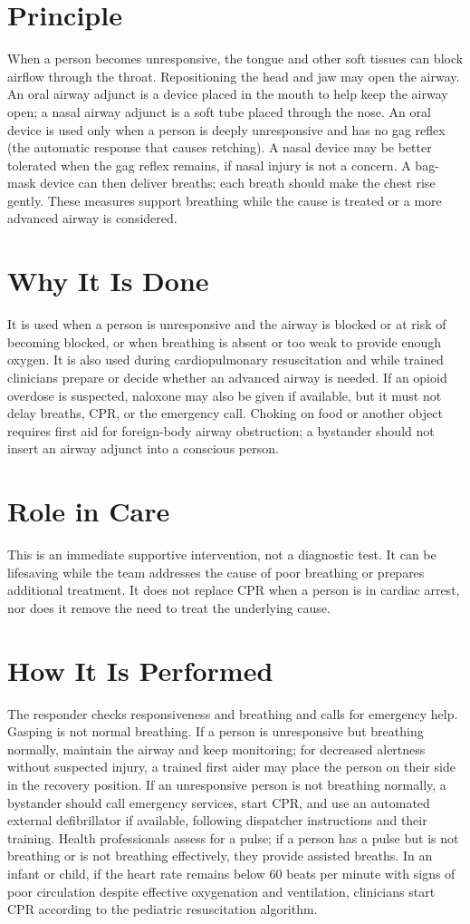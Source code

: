 \section*{Principle}
When a person becomes unresponsive, the tongue and other soft tissues can block airflow through the throat. Repositioning the head and jaw may open the airway. An oral airway adjunct is a device placed in the mouth to help keep the airway open; a nasal airway adjunct is a soft tube placed through the nose. An oral device is used only when a person is deeply unresponsive and has no gag reflex (the automatic response that causes retching). A nasal device may be better tolerated when the gag reflex remains, if nasal injury is not a concern. A bag-mask device can then deliver breaths; each breath should make the chest rise gently. These measures support breathing while the cause is treated or a more advanced airway is considered.
\section*{Why It Is Done}
It is used when a person is unresponsive and the airway is blocked or at risk of becoming blocked, or when breathing is absent or too weak to provide enough oxygen. It is also used during cardiopulmonary resuscitation and while trained clinicians prepare or decide whether an advanced airway is needed. If an opioid overdose is suspected, naloxone may also be given if available, but it must not delay breaths, CPR, or the emergency call. Choking on food or another object requires first aid for foreign-body airway obstruction; a bystander should not insert an airway adjunct into a conscious person.
\section*{Role in Care}
This is an immediate supportive intervention, not a diagnostic test. It can be lifesaving while the team addresses the cause of poor breathing or prepares additional treatment. It does not replace CPR when a person is in cardiac arrest, nor does it remove the need to treat the underlying cause.
\section*{How It Is Performed}
The responder checks responsiveness and breathing and calls for emergency help. Gasping is not normal breathing. If a person is unresponsive but breathing normally, maintain the airway and keep monitoring; for decreased alertness without suspected injury, a trained first aider may place the person on their side in the recovery position. If an unresponsive person is not breathing normally, a bystander should call emergency services, start CPR, and use an automated external defibrillator if available, following dispatcher instructions and their training. Health professionals assess for a pulse; if a person has a pulse but is not breathing or is not breathing effectively, they provide assisted breaths. In an infant or child, if the heart rate remains below 60 beats per minute with signs of poor circulation despite effective oxygenation and ventilation, clinicians start CPR according to the pediatric resuscitation algorithm.

